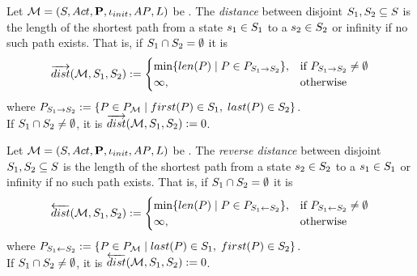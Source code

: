 \documentclass[preview]{standalone}
\begin{document}
\begin{definition}
	Let ${{{\mathcal{M}}}} = {{({S}, {Act}, {\textbf{P}}, {\iota_{init}}, {AP}, {L})}}$ be \achgphN. The \emph{distance} between disjoint ${S}_1, {S}_2 \subseteq {S}$ is the length of the shortest path from a state ${s}_1 \in {S}_1$ to a ${s}_2 \in {S}_2$ or infinity if no such path exists. That is, if ${S}_1 \cap {S}_2 = \emptyset$ it is		
	\[
		{\overrightarrow{dist}}({{{\mathcal{M}}}}, {S}_1, {S}_2) := 
		\begin{cases}
			\min\{{len}({P}) \mid {P} \in P_{{S}_1 \to {S}_2}\}, &\text{if } P_{{S}_1 \to {S}_2} \neq \emptyset \\
			\infty, &\text{otherwise}
		\end{cases}
	\]
	where $P_{\states_1 \to \states_2} := \{\path \in \pathset \mid \pfirst(\path) \in \states_1, \; \plast(\path) \in \states_2\}$. \\
	\noindent
	If ${S}_1 \cap {S}_2 \neq \emptyset$, it is ${\overrightarrow{dist}}({{{\mathcal{M}}}}, {S}_1, {S}_2) := 0$.
	\label{def:distance}
\end{definition}

\begin{definition}
	Let ${{{\mathcal{M}}}} = {{({S}, {Act}, {\textbf{P}}, {\iota_{init}}, {AP}, {L})}}$ be \achgphN. The \emph{reverse distance} between disjoint ${S}_1, {S}_2 \subseteq {S}$ is the length of the shortest path from a state ${s}_2 \in {S}_2$ to a ${s}_1 \in {S}_1$ or infinity if no such path exists. That is, if ${S}_1 \cap {S}_2 = \emptyset$ it is		
	\[
	{\overleftarrow{dist}}({{{\mathcal{M}}}}, {S}_1, {S}_2) := 
	\begin{cases}
		\min\{{len}({P}) \mid {P} \in P_{{S}_1 \leftarrow {S}_2}\}, &\text{if } P_{{S}_1 \leftarrow {S}_2} \neq \emptyset \\
		\infty, &\text{otherwise}
	\end{cases}
	\]
	where $P_{\states_1 \leftarrow \states_2} := \{\path \in \pathset \mid \plast(\path) \in \states_1, \; \pfirst(\path) \in \states_2\}$. \\
	\noindent
	If ${S}_1 \cap {S}_2 \neq \emptyset$, it is ${\overleftarrow{dist}}({{{\mathcal{M}}}}, {S}_1, {S}_2) := 0$.
\end{definition}
\end{document}
